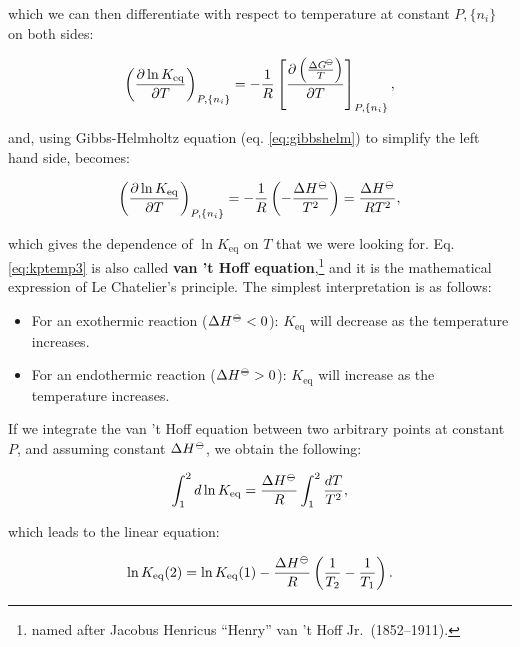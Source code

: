 \documentclass[
  9pt,
]{extbook}
\providecommand{\tightlist}{%
  \setlength{\itemsep}{0pt}\setlength{\parskip}{0pt}}
\theoremstyle{definition}
\theoremstyle{definition}
\theoremstyle{definition}
\theoremstyle{definition}
\theoremstyle{remark}
\begin{document}
which we can then differentiate with respect to temperature at constant \(P,\{n_i\}\) on both sides:

\begin{equation}
\left( \frac{\partial \ln K_{\text{eq}}}{\partial T} \right)_{P,\{n_i\}} = -\frac{1}{R}  \left[ \frac{\partial \left( \frac{\Delta G^{-\kern-6pt{\ominus}\kern-6pt-}}{T} \right)}{\partial T} \right]_{P,\{n_i\}},
\label{eq:kptemp2}
\end{equation}

and, using Gibbs-Helmholtz equation (eq. \eqref{eq:gibbshelm}) to simplify the left hand side, becomes:

\begin{equation}
\left( \frac{\partial \ln K_{\text{eq}}}{\partial T} \right)_{P,\{n_i\}} = -\frac{1}{R} \left( -\frac{\Delta H^{-\kern-6pt{\ominus}\kern-6pt-}}{T^2} \right) = \frac{\Delta H^{-\kern-6pt{\ominus}\kern-6pt-}}{RT^2},
\label{eq:kptemp3}
\end{equation}

which gives the dependence of \(\ln K_{\text{eq}}\) on \(T\) that we were looking for. Eq. \eqref{eq:kptemp3} is also called \textbf{van 't Hoff equation},\footnote{named after Jacobus Henricus ``Henry'' van 't Hoff Jr.~(1852--1911).} and it is the mathematical expression of Le Chatelier's principle. The simplest interpretation is as follows:

\begin{itemize}
\tightlist
\item
  For an exothermic reaction (\(\Delta H^{-\kern-6pt{\ominus}\kern-6pt-}< 0\)): \(K_{\text{eq}}\) will decrease as the temperature increases.
\item
  For an endothermic reaction (\(\Delta H^{-\kern-6pt{\ominus}\kern-6pt-}> 0\)): \(K_{\text{eq}}\) will increase as the temperature increases.
\end{itemize}

If we integrate the van 't Hoff equation between two arbitrary points at constant \(P\), and assuming constant \(\Delta H^{-\kern-6pt{\ominus}\kern-6pt-}\), we obtain the following:

\begin{equation}
\int_1^2 d \ln K_{\text{eq}} = \frac{\Delta H^{-\kern-6pt{\ominus}\kern-6pt-}}{R} \int_1^2 \frac{dT}{T^2},
\label{eq:kptemp4}
\end{equation}

which leads to the linear equation:

\begin{equation}
\ln K_{\text{eq}}(2) = \ln K_{\text{eq}}(1) - \frac{\Delta H^{-\kern-6pt{\ominus}\kern-6pt-}}{R} \left( \frac{1}{T_2}-\frac{1}{T_1} \right).
\label{eq:vthoffeqI}
\end{equation}
\end{document}
